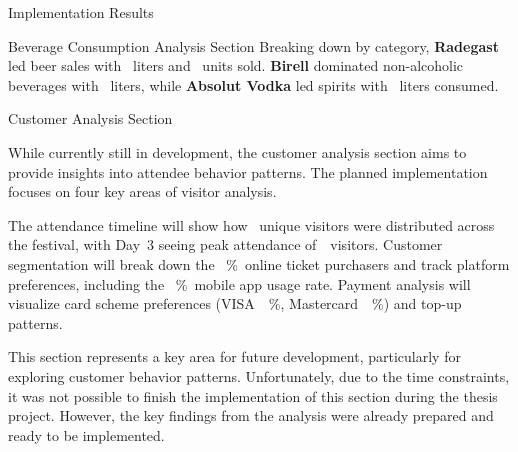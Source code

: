 \begin{section}{Implementation Results}
\begin{subsection}{Beverage Consumption Analysis Section}
		Breaking down by category, \textbf{Radegast} led beer sales with ~liters and ~units sold.
		\textbf{Birell} dominated non-alcoholic beverages with ~liters, while \textbf{Absolut Vodka} led spirits with ~liters consumed.
	\end{subsection}

	\begin{subsection}{Customer Analysis Section}
		\label{subsec:implementation-results-structure-customer}

		While currently still in development, the customer analysis section aims to provide insights into attendee behavior patterns.
		The planned implementation focuses on four key areas of visitor analysis.


		The attendance timeline will show how ~unique visitors were distributed across the festival, with Day~3 seeing peak attendance of~~visitors.
		Customer segmentation will break down the ~\%~online ticket purchasers and track platform preferences, including the ~\%~mobile app usage rate.
		Payment analysis will visualize card scheme preferences (VISA~~\%, Mastercard~~\%) and top-up patterns.

		This section represents a key area for future development, particularly for exploring customer behavior patterns.
		Unfortunately, due to the time constraints, it was not possible to finish the implementation of this section during the thesis project.
		However, the key findings from the analysis were already prepared and ready to be implemented.
	\end{subsection}
\end{section}


